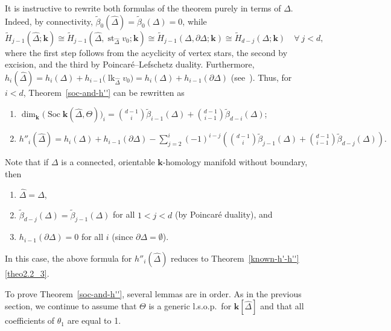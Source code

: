 \documentclass[ALCO,ThmDefs,Unicode,epreuves]{cedram}
\DeclareMathOperator\lk{lk}
\DeclareMathOperator\st{st}
\DeclareMathOperator{\Soc}{Soc}
\newcommand{\complet}[1]{\hat{#1}}
\newcommand{\field}{\mathbf{k}}
\begin{document}
\begin{rema} \label{rem:h''-v2}
It is instructive to rewrite both formulas of the theorem purely in terms of $\Delta$. Indeed, by connectivity, $\tilde{\beta}_0(\complet{\Delta})=\tilde{\beta}_0(\Delta)=0$, while
\[\tilde{H}_{j-1}(\complet{\Delta};\field)\cong \tilde{H}_{j-1}(\complet{\Delta}, \st_{\complet{\Delta}}v_0;\field)\cong \tilde{H}_{j-1}(\Delta, \partial\Delta;\field)\cong \tilde{H}_{d-j}(\Delta;\field) \quad \forall ~ j< d,\]
where the first step follows from the acyclicity of vertex stars, the second by excision, and the third by Poincar{\'e}--Lefschetz duality. Furthermore, $h_i(\complet{\Delta})=h_i(\Delta)+h_{i-1}\big(\lk_{\complet{\Delta}}v_0\big)=h_i(\Delta)+h_{i-1}(\partial\Delta)$ (see~\cite[Lemma~4.1]{Athanasiadis-11}).
Thus, for $i<d$, Theorem~\ref{soc-and-h''} can be rewritten as
\begin{enumerate}
\item\label{rema4.2_1} $\dim_\field \big(\Soc \field(\complet{\Delta},\Theta)\big)_i=\binom{d-1}{i}\tilde{\beta}_{i-1}(\Delta)+\binom{d-1}{i-1}\tilde{\beta}_{d-i}(\Delta)$;
\item\label{rema4.2_2}
$h''_i(\complet{\Delta})=h_i(\Delta)+h_{i-1}(\partial\Delta)-\sum_{j=2}^{i}(-1)^{i-j}\left(\binom{d-1}{i}\tilde{\beta}_{j-1}(\Delta)+\binom{d-1}{i-1}\tilde{\beta}_{d-j}(\Delta)\right).$
\end{enumerate}
Note that if $\Delta$ is a connected, orientable $\field$-homology manifold without boundary, then 
\begin{enumerate}[label=(\roman*)]
\item %
$\complet{\Delta}=\Delta$, 
\item %
$\tilde{\beta}_{d-j}(\Delta)=\tilde{\beta}_{j-1}(\Delta)$ for all $1<j<d$ (by Poincar{\'e} duality), and 
\item %
$h_{i-1}(\partial\Delta)=0$ for all $i$ (since $\partial\Delta=\emptyset$).
\end{enumerate}
 In this case, the above formula for $h''_i(\complet{\Delta})$ reduces to Theorem~\ref{known-h'-h''}\eqref{theo2.2_3}.
\end{rema}


To prove Theorem~\ref{soc-and-h''}, several lemmas are in order. As in the previous section, we continue to assume that $\Theta$ is a generic l.s.o.p.~for $\field[\complet{\Delta}]$ and that all coefficients of $\theta_1$ are equal to 1.
\end{document}
